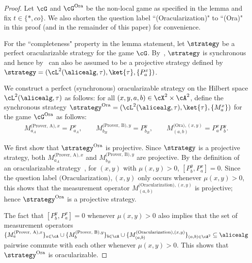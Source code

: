 \begin{proof}
Let $\cG$ and $\cG^{\text{Ora}}$ be the non-local game as specified in the lemma and fix $t \in \{*, co\}$. We also shorten the question label ``(Oracularization)" to ``(Ora)" in this proof (and in the remainder of this paper) for convenience. 

For the ``completeness" property in the lemma statement, let $\strategy$ be a perfect oracularizable strategy for the game $\cG$. By~, $\strategy$ is synchronous and hence by~ can also be assumed to be a projective strategy defined by $\strategy = (\cL^2(\alicealg, \tau), \ket{\tau}, \{P_a^x \})$. 

We construct a perfect (synchronous) oracularizable strategy on the Hilbert space $\cL^2(\alicealg, \tau)$ as follows: for all $(x,y,a,b) \in \cX^2 \times \cA^2$, define the synchronous strategy $\strategy^{\text{Ora}} = (\cL^2(\alicealg, \tau), \ket{\tau}, \{M_a^x \})$ for the game $\cG^{\text{Ora}}$ as follows:
\begin{align*}
	M_{a_A}^{\text{(Prover, A)}, x} = P^x_{a_A}, \qquad 	M_{b_B}^{\text{(Prover, B)}, y} = P^y_{b_B}, \qquad 	M_{(a,b)}^{\text{(Ora)}, (x,y)} = P^x_a P^y_b. 
\end{align*}

We first show that $\strategy^{\text{Ora}}$ is projective. Since $\strategy$ is a projective strategy, both $M_{a_A}^{\text{(Prover, A)}, x}$ and $M_{b_B}^{\text{(Prover, B)}, y}$ are projective. By the definition of an oracularizable strategy~, for $(x,y)$ with $\mu(x,y) > 0$, $[P^y_b,  P^x_a] = 0$. Since the question label $\text{(Oracularization)}, (x,y)$ only occurs whenever $\mu(x,y) > 0$, this shows that the measurement operator $M_{(a,b)}^{\text{(Oracularization)}, (x,y)}$ is projective; hence $\strategy^{\text{Ora}}$ is a projective strategy. 

The fact that $[P^y_b,  P^x_a] = 0$ whenever $\mu(x,y) > 0$ also implies that the set of measurement operators $\{M_{a}^{\text{(Prover, A)}, x}\}_{a \in \cA} \cup  \{M_{b}^{\text{(Prover, B)}, y}\}_{b \in \cA} \cup \{ M_{(a,b)}^{\text{(Oracularization)}, (x,y)} \}_{(a,b) \in \cA^2} \subseteq \alicealg$ pairwise commute with each other whenever $\mu(x,y) > 0$. This shows that $\strategy^{\text{Ora}}$ is oracularizable. 



\end{proof}
